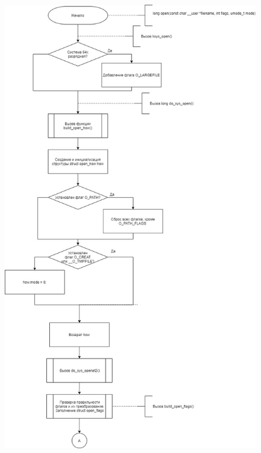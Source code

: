 \documentclass[a4paper,14pt]{extreport}
\begin{document}
\begin{figure}[H]
	\centering
	\includegraphics[scale=0.4]{img/open1.jpg}
\end{figure}
\end{document}
